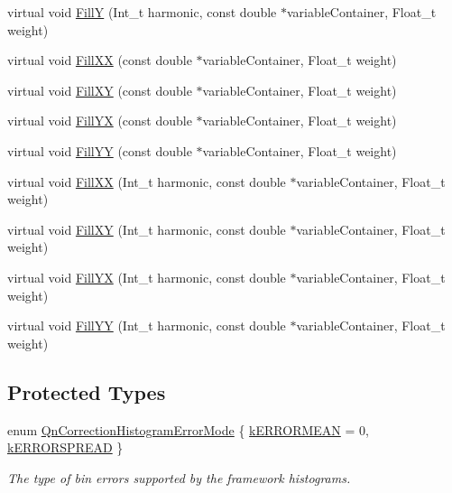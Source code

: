 \begin{DoxyCompactItemize}
virtual void \mbox{\hyperlink{classQn_1_1CorrectionHistogramBase_afeb105fa2b517f44c41546e83dc49e02}{FillY}} (Int\+\_\+t harmonic, const double $\ast$variable\+Container, Float\+\_\+t weight)
\item 
virtual void \mbox{\hyperlink{classQn_1_1CorrectionHistogramBase_a42a813abe035719dddedf2102fbfbdc9}{Fill\+XX}} (const double $\ast$variable\+Container, Float\+\_\+t weight)
\item 
virtual void \mbox{\hyperlink{classQn_1_1CorrectionHistogramBase_a3ede7e510526e205704ec78e7c7254a3}{Fill\+XY}} (const double $\ast$variable\+Container, Float\+\_\+t weight)
\item 
virtual void \mbox{\hyperlink{classQn_1_1CorrectionHistogramBase_a70d3afc8ffdca9af505143d365c210bc}{Fill\+YX}} (const double $\ast$variable\+Container, Float\+\_\+t weight)
\item 
virtual void \mbox{\hyperlink{classQn_1_1CorrectionHistogramBase_a06e19e77ff3ba40039b3e1d84ad7a227}{Fill\+YY}} (const double $\ast$variable\+Container, Float\+\_\+t weight)
\item 
virtual void \mbox{\hyperlink{classQn_1_1CorrectionHistogramBase_a6947a657eade839da923b156d99ca10d}{Fill\+XX}} (Int\+\_\+t harmonic, const double $\ast$variable\+Container, Float\+\_\+t weight)
\item 
virtual void \mbox{\hyperlink{classQn_1_1CorrectionHistogramBase_a93a446798e53ea386ce0e3fc882abae8}{Fill\+XY}} (Int\+\_\+t harmonic, const double $\ast$variable\+Container, Float\+\_\+t weight)
\item 
virtual void \mbox{\hyperlink{classQn_1_1CorrectionHistogramBase_a3acc9d80584f1909771f3fcaac98d5e4}{Fill\+YX}} (Int\+\_\+t harmonic, const double $\ast$variable\+Container, Float\+\_\+t weight)
\item 
virtual void \mbox{\hyperlink{classQn_1_1CorrectionHistogramBase_a47c735fa34636b5d7132fff4029f13b5}{Fill\+YY}} (Int\+\_\+t harmonic, const double $\ast$variable\+Container, Float\+\_\+t weight)
\end{DoxyCompactItemize}
\subsection*{Protected Types}
\begin{DoxyCompactItemize}
\item 
enum \mbox{\hyperlink{classQn_1_1CorrectionHistogramBase_ab32a60a9143c64f214ab3a2ed9263dfc}{Qn\+Correction\+Histogram\+Error\+Mode}} \{ \mbox{\hyperlink{classQn_1_1CorrectionHistogramBase_ab32a60a9143c64f214ab3a2ed9263dfca0e83b494af5f6993b4607410d8b61073}{k\+E\+R\+R\+O\+R\+M\+E\+AN}} = 0, 
\mbox{\hyperlink{classQn_1_1CorrectionHistogramBase_ab32a60a9143c64f214ab3a2ed9263dfcad71fc5d077efede2d3f2c028a219b4bd}{k\+E\+R\+R\+O\+R\+S\+P\+R\+E\+AD}}
 \}
\begin{DoxyCompactList}\small\item\em The type of bin errors supported by the framework histograms. \end{DoxyCompactList}\end{DoxyCompactItemize}
